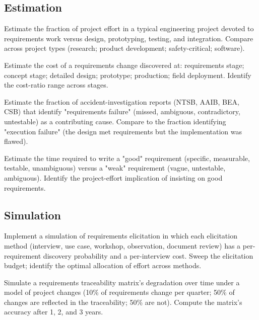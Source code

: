 \subsection*{Estimation}

\begin{exercise}
Estimate the fraction of project effort in a typical engineering project devoted to requirements work versus design, prototyping, testing, and integration. Compare across project types (research; product development; safety-critical; software).
\end{exercise}

\begin{exercise}
Estimate the cost of a requirements change discovered at: requirements stage; concept stage; detailed design; prototype; production; field deployment. Identify the cost-ratio range across stages.
\end{exercise}

\begin{exercise}
Estimate the fraction of accident-investigation reports (NTSB, AAIB, BEA, CSB) that identify "requirements failure" (missed, ambiguous, contradictory, untestable) as a contributing cause. Compare to the fraction identifying "execution failure" (the design met requirements but the implementation was flawed).
\end{exercise}

\begin{exercise}
Estimate the time required to write a "good" requirement (specific, measurable, testable, unambiguous) versus a "weak" requirement (vague, untestable, ambiguous). Identify the project-effort implication of insisting on good requirements.
\end{exercise}

\subsection*{Simulation}

\begin{exercise}
Implement a simulation of requirements elicitation in which each elicitation method (interview, use case, workshop, observation, document review) has a per-requirement discovery probability and a per-interview cost. Sweep the elicitation budget; identify the optimal allocation of effort across methods.
\end{exercise}

\begin{exercise}
Simulate a requirements traceability matrix's degradation over time under a model of project changes (10\% of requirements change per quarter; 50\% of changes are reflected in the traceability; 50\% are not). Compute the matrix's accuracy after 1, 2, and 3 years.
\end{exercise}

